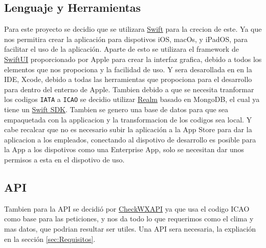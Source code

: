 \subsection{Lenguaje y Herramientas}
\label{subsec:LengHerr}

Para este proyecto se decidio que se utilizara \href{https://www.swift.org}{Swift} para la crecion de este. Ya que nos
permitira crear la aplicación para dispotivos iOS, macOs, y iPadOS, para facilitar el uso de la aplicación. Aparte de esto se
utilizara el framework de \href{https://developer.apple.com/documentation/swiftui/}{SwiftUI} proporcionado por Apple para crear la
interfaz grafica, debido a todos los elementos que nos propociona y la facilidad de uso. Y sera desarollada en en la IDE, Xcode, debido a todas las herramientas que propociona para el desarrollo para
dentro del enterno de Apple. Tambien debido a que se necesita tranformar los codigos \texttt{IATA} a \texttt{ICAO} se decidio
utilizar \href{https://realm.io/}{Realm} basado en MongoDB, el cual ya tiene un \href{https://www.mongodb.com/docs/realm/sdk/swift/#realm-swift-sdk}{Swift SDK}.
Tambien se genero una base de datos para que sea empaquetada con la applicacion y la transformacion de los codigos sea local.
Y cabe recalcar que no es necesario subir la aplicación a la App Store para dar la aplicacion a los empleados, conectando al
dispotivo de desarrollo es posible para la App a los dispotivos como una Enterprise App, solo se necesitan dar unos permisos
a esta en el dispotivo de uso.


\subsection{API}
\label{subsec:API}
Tambien para la API se decidió por \href{https://www.checkwxapi.com}{CheckWXAPI} ya que usa el codigo ICAO como base para las peticiones,
y nos da todo lo que requerimos como el clima y mas datos, que podrian resultar ser utiles. Una API sera necesaria, la expliación en la
sección \ref{sec:Requisitos}.
